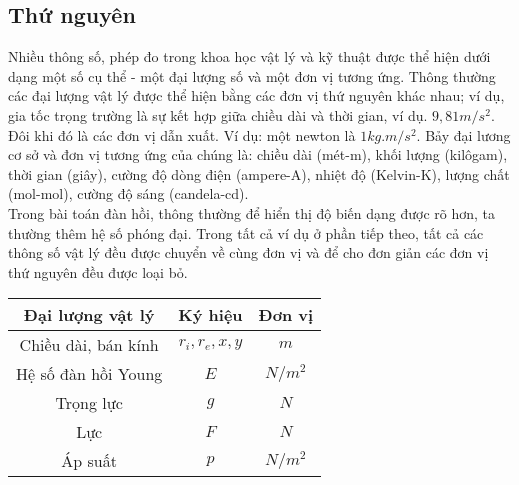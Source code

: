 \documentclass[
12pt, %
oneside, %
english, %
onehalfspacing, %
nolistspacing, %
headsepline, %
addchap,
]{MastersDoctoralThesis} %
\begin{document}
\subsection{Thứ nguyên}
Nhiều thông số, phép đo trong khoa học vật lý và kỹ thuật được thể hiện dưới dạng một số cụ thể - một đại lượng số và một đơn vị tương ứng. Thông thường các đại lượng vật lý được thể hiện bằng các đơn vị thứ nguyên khác nhau; ví dụ, gia tốc trọng trường là sự kết hợp giữa chiều dài và thời gian, ví dụ. $9,81m/s^2$. Đôi khi đó là các đơn vị dẫn xuất. Ví dụ: một newton là $1 kg.m/s^2$. Bảy đại lương cơ sở và đơn vị tương ứng của chúng là: chiều dài (mét-m), khối lượng (kilôgam), thời gian (giây), cường độ dòng điện (ampere-A), nhiệt độ (Kelvin-K), lượng chất (mol-mol), cường độ sáng (candela-cd).\\
Trong bài toán đàn hồi, thông thường để hiển thị độ biến dạng được rõ hơn, ta thường thêm hệ số phóng đại. Trong tất cả ví dụ ở phần tiếp theo, tất cả các thông số vật lý đều được chuyển về cùng đơn vị và để cho đơn giản các đơn vị thứ nguyên đều được loại bỏ.
\begin{center}
\begin{tabular}{ |c|c|c| } 
 \hline
 Đại lượng vật lý & Ký hiệu & Đơn vị \\ 
 \hline
 Chiều dài, bán kính & $r_i, r_e, x, y$ & $m$ \\ 
 Hệ số đàn hồi Young & $E$ & $N/m^2$ \\ 
 Trọng lực & $g$ & $N$ \\ 
 Lực & $F$ & $N$ \\ 
 Áp suất & $p$ & $N/m^2$ \\ 
 \hline
\end{tabular}
\end{center}
\end{document}
